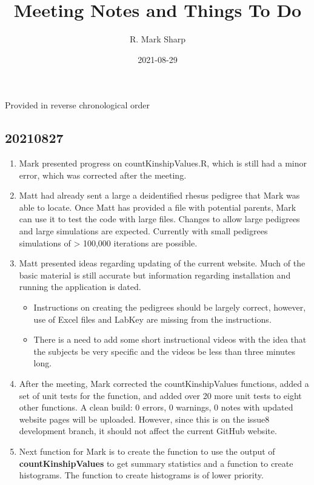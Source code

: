 \documentclass[
]{article}
\title{Meeting Notes and Things To Do}
\author{R. Mark Sharp}
\date{2021-08-29}
\providecommand{\tightlist}{%
  \setlength{\itemsep}{0pt}\setlength{\parskip}{0pt}}
\begin{document}
\maketitle

Provided in reverse chronological order

\hypertarget{section}{%
\subsection{20210827}\label{section}}

\begin{enumerate}
\def\labelenumi{\arabic{enumi}.}
\tightlist
\item
  Mark presented progress on countKinshipValues.R, which is still had a
  minor error, which was corrected after the meeting.
\item
  Matt had already sent a large a deidentified rhesus pedigree that Mark
  was able to locate. Once Matt has provided a file with potential
  parents, Mark can use it to test the code with large files. Changes to
  allow large pedigrees and large simulations are expected. Currently
  with small pedigrees simulations of \textgreater{} 100,000 iterations
  are possible.
\item
  Matt presented ideas regarding updating of the current website. Much
  of the basic material is still accurate but information regarding
  installation and running the application is dated.

  \begin{itemize}
  \tightlist
  \item
    Instructions on creating the pedigrees should be largely correct,
    however, use of Excel files and LabKey are missing from the
    instructions.
  \item
    There is a need to add some short instructional videos with the idea
    that the subjects be very specific and the videos be less than three
    minutes long.
  \end{itemize}
\item
  After the meeting, Mark corrected the countKinshipValues functions,
  added a set of unit tests for the function, and added over 20 more
  unit tests to eight other functions. A clean build: 0 errors, 0
  warnings, 0 notes with updated website pages will be uploaded.
  However, since this is on the issue8 development branch, it should not
  affect the current GitHub website.
\item
  Next function for Mark is to create the function to use the output of
  \textbf{countKinshipValues} to get summary statistics and a function
  to create histograms. The function to create histograms is of lower
  priority.
\end{enumerate}
\end{document}
